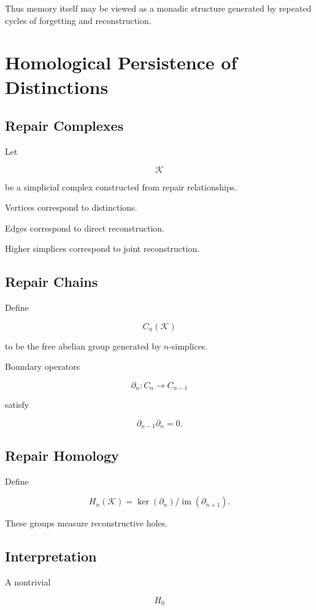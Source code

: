 \documentclass[12pt,oneside]{book}
\theoremstyle{plain} \newtheorem{theorem}{Theorem}[chapter] \newtheorem{lemma}[theorem]{Lemma} \newtheorem{proposition}[theorem]{Proposition} \newtheorem{corollary}[theorem]{Corollary}
\theoremstyle{definition} \newtheorem{definition}[theorem]{Definition} \newtheorem{axiom}[theorem]{Axiom} \newtheorem{construction}[theorem]{Construction}
\theoremstyle{remark} \newtheorem{remark}[theorem]{Remark} \newtheorem{example}[theorem]{Example}
\begin{document}
Thus memory itself may be viewed as a monadic structure generated by repeated cycles of forgetting and reconstruction.

\chapter{Homological Persistence of Distinctions}

\section{Repair Complexes}

Let

\[
\mathcal K
\]

be a simplicial complex constructed from repair relationships.

Vertices correspond to distinctions.

Edges correspond to direct reconstruction.

Higher simplices correspond to joint reconstruction.

\section{Repair Chains}

Define

\[
C_n(\mathcal K)
\]

to be the free abelian group generated by $n$-simplices.

Boundary operators

\[
\partial_n
:
C_n
\rightarrow
C_{n-1}
\]

satisfy

\[
\partial_{n-1}\partial_n=0.
\]

\section{Repair Homology}

Define

\[
H_n(\mathcal K)
=
\ker(\partial_n)
/
\operatorname{im}(\partial_{n+1}).
\]

These groups measure reconstructive holes.

\section{Interpretation}

A nontrivial

\[
H_0
\]
\end{document}
